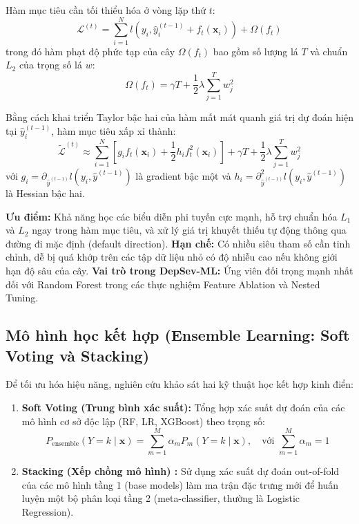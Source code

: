 Hàm mục tiêu cần tối thiểu hóa ở vòng lặp thứ $t$:
\begin{equation}
    \mathcal{L}^{(t)} = \sum_{i=1}^N l(y_i, \hat{y}_i^{(t-1)} + f_t(\mathbf{x}_i)) + \Omega(f_t)
\end{equation}
trong đó hàm phạt độ phức tạp của cây $\Omega(f_t)$ bao gồm số lượng lá $T$ và chuẩn $L_2$ của trọng số lá $w$:
\begin{equation}
    \Omega(f_t) = \gamma T + \frac{1}{2} \lambda \sum_{j=1}^T w_j^2
\end{equation}

Bằng cách khai triển Taylor bậc hai của hàm mất mát quanh giá trị dự đoán hiện tại $\hat{y}_i^{(t-1)}$, hàm mục tiêu xấp xỉ thành:
\begin{equation}
    \tilde{\mathcal{L}}^{(t)} \approx \sum_{i=1}^N \left[ g_i f_t(\mathbf{x}_i) + \frac{1}{2} h_i f_t^2(\mathbf{x}_i) \right] + \gamma T + \frac{1}{2} \lambda \sum_{j=1}^T w_j^2
\end{equation}
với $g_i = \partial_{\hat{y}^{(t-1)}} l(y_i, \hat{y}^{(t-1)})$ là gradient bậc một và $h_i = \partial^2_{\hat{y}^{(t-1)}} l(y_i, \hat{y}^{(t-1)})$ là Hessian bậc hai.

\textbf{Ưu điểm:} Khả năng học các biểu diễn phi tuyến cực mạnh, hỗ trợ chuẩn hóa $L_1$ và $L_2$ ngay trong hàm mục tiêu, và xử lý giá trị khuyết thiếu tự động thông qua đường đi mặc định (default direction).  
\textbf{Hạn chế:} Có nhiều siêu tham số cần tinh chỉnh, dễ bị quá khớp trên các tập dữ liệu nhỏ có độ nhiễu cao nếu không giới hạn độ sâu của cây.  
\textbf{Vai trò trong DepSev-ML:} Ứng viên đối trọng mạnh nhất đối với Random Forest trong các thực nghiệm Feature Ablation và Nested Tuning.

\subsection{Mô hình học kết hợp (Ensemble Learning: Soft Voting và Stacking)}
Để tối ưu hóa hiệu năng, nghiên cứu khảo sát hai kỹ thuật học kết hợp kinh điển:
\begin{enumerate}
    \item \textbf{Soft Voting (Trung bình xác suất):} Tổng hợp xác suất dự đoán của các mô hình cơ sở độc lập (RF, LR, XGBoost) theo trọng số:
    \begin{equation}
        P_{\text{ensemble}}(Y = k \mid \mathbf{x}) = \sum_{m=1}^M \alpha_m P_m(Y = k \mid \mathbf{x}), \quad \text{với } \sum_{m=1}^M \alpha_m = 1
    \end{equation}
    \item \textbf{Stacking (Xếp chồng mô hình) \cite{wolpert1992stacked}:} Sử dụng xác suất dự đoán out-of-fold của các mô hình tầng 1 (base models) làm ma trận đặc trưng mới để huấn luyện một bộ phân loại tầng 2 (meta-classifier, thường là Logistic Regression).
\end{enumerate}


